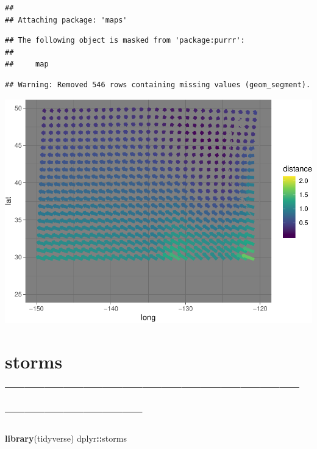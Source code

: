 \documentclass[]{article}
\newenvironment{Shaded}{\begin{snugshade}}{\end{snugshade}}
\newcommand{\KeywordTok}[1]{\textcolor[rgb]{0.13,0.29,0.53}{\textbf{#1}}}
\newcommand{\NormalTok}[1]{#1}
\newcommand{\OperatorTok}[1]{\textcolor[rgb]{0.81,0.36,0.00}{\textbf{#1}}}
\begin{document}
\begin{verbatim}
## 
## Attaching package: 'maps'
\end{verbatim}

\begin{verbatim}
## The following object is masked from 'package:purrr':
## 
##     map
\end{verbatim}

\begin{verbatim}
## Warning: Removed 546 rows containing missing values (geom_segment).
\end{verbatim}

\includegraphics{R_tidyverse_for_geographers_files/figure-latex/unnamed-chunk-28-1.pdf}

\hypertarget{storms}{%
\section{storms
------------------------------------------------------------------}\label{storms}}

\begin{Shaded}
\begin{Highlighting}[]
\KeywordTok{library}\NormalTok{(tidyverse)}
\NormalTok{dplyr}\OperatorTok{::}\NormalTok{storms}
\end{Highlighting}
\end{Shaded}
\end{document}
